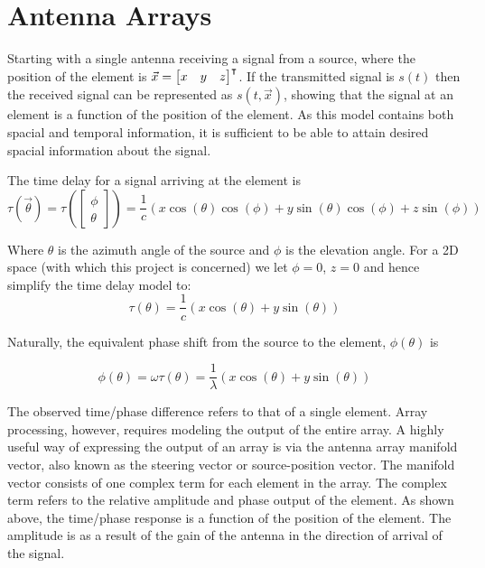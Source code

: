\section{Antenna Arrays}

Starting with a single antenna receiving a signal from a source, where the position of the element is \(\vec{x} = \begin{bmatrix}x & y & z \end{bmatrix}^\intercal\). 
If the transmitted signal is \(s(t)\) then the received signal can be represented as \(s(t, \vec{x})\), showing that the signal at an element is a function of the position of the element.
As this model contains both spacial and temporal information, it is sufficient to be able to attain desired spacial information about the signal\cite{krim1996two}.

The time delay for a signal arriving at the element is \cite{poisel2012electronic}
\begin{equation}
  \tau(\vec{\theta}) 
 = \tau( \begin{bmatrix} \phi \\ \theta \end{bmatrix} )
 = \frac{1}{c} \left( x\cos(\theta)\cos(\phi) + y\sin(\theta)\cos(\phi) + z\sin(\phi) \right)
\end{equation}

Where \(\theta\) is the azimuth angle of the source and \(\phi\) is the elevation angle.
For a 2D space (with which this project is concerned) we let \(\phi= 0\), \(z = 0\) and hence simplify the time delay model to:
\begin{equation}
  \tau(\theta) = \frac{1}{c} \left( x\cos(\theta) + y\sin(\theta) \right)
\end{equation}

Naturally, the equivalent phase shift from the source to the element, \(\phi(\theta)\) is

\begin{equation}
  \phi(\theta) = \omega\tau(\theta) = \frac{1}{\lambda} \left( x\cos(\theta) + y\sin(\theta) \right)
\end{equation}

The observed time/phase difference refers to that of a single element. 
Array processing, however, requires modeling the output of the entire array. 
A highly useful way of expressing the output of an array is via the antenna array manifold vector, also known as the steering vector or source-position vector. 
The manifold vector consists of one complex term for each element in the array. 
The complex term refers to the relative amplitude and phase output of the element. 
As shown above, the time/phase response is a function of the position of the element. 
The amplitude is as a result of the gain of the antenna in the direction of arrival of the signal. 

